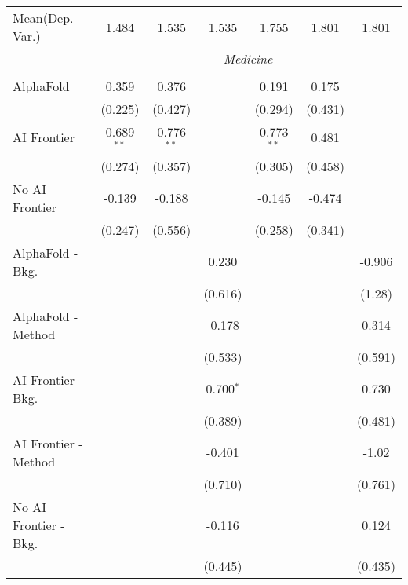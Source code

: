 \begin{tabular}{lcccccc}
Mean(Dep. Var.) & 1.484 & 1.535 & 1.535 & 1.755 & 1.801 & 1.801 \\
 & \multicolumn{6}{c}{\textit{Medicine}} \\ \\
   AlphaFold               & 0.359        & 0.376        &             & 0.191        & 0.175   &   \\   
                           & (0.225)      & (0.427)      &             & (0.294)      & (0.431) &   \\   
   AI Frontier             & 0.689$^{**}$ & 0.776$^{**}$ &             & 0.773$^{**}$ & 0.481   &   \\   
                           & (0.274)      & (0.357)      &             & (0.305)      & (0.458) &   \\   
   No AI Frontier          & -0.139       & -0.188       &             & -0.145       & -0.474  &   \\   
                           & (0.247)      & (0.556)      &             & (0.258)      & (0.341) &   \\   
   AlphaFold - Bkg.        &              &              & 0.230       &              &         & -0.906\\   
                           &              &              & (0.616)     &              &         & (1.28)\\   
   AlphaFold - Method      &              &              & -0.178      &              &         & 0.314\\   
                           &              &              & (0.533)     &              &         & (0.591)\\   
   AI Frontier - Bkg.      &              &              & 0.700$^{*}$ &              &         & 0.730\\   
                           &              &              & (0.389)     &              &         & (0.481)\\   
   AI Frontier - Method    &              &              & -0.401      &              &         & -1.02\\   
                           &              &              & (0.710)     &              &         & (0.761)\\   
   No AI Frontier - Bkg.   &              &              & -0.116      &              &         & 0.124\\   
                           &              &              & (0.445)     &              &         & (0.435)\\   

\end{tabular}
